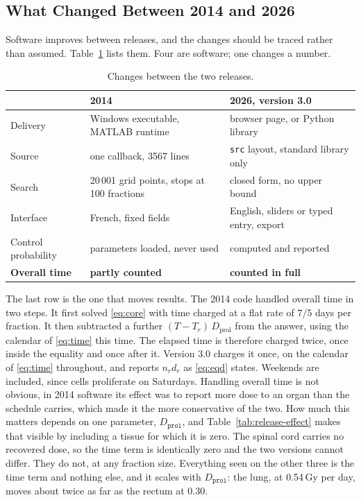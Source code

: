 \documentclass[preprint,12pt,number]{elsarticle}
\begin{document}
\subsection{What Changed Between 2014 and 2026} \label{sec:release}
Software improves between releases, and the changes should be traced rather than assumed. Table~\ref{tab:release} lists them. Four are software; one changes a number.
    \begin{table}
    \centering
    \small
    \begin{tabular}{@{}lp{5.2cm}p{5.2cm}@{}}
    \toprule
     & \textbf{2014} & \textbf{2026, version 3.0} \\
    \midrule
    Delivery & Windows executable, MATLAB runtime & browser page, or Python library \\
    Source & one callback, 3567 lines & \texttt{src} layout, standard library only \\
    Search & 20\,001 grid points, stops at 100 fractions & closed form, no upper bound \\
    Interface & French, fixed fields & English, sliders or typed entry, export \\
    Control probability & parameters loaded, never used & computed and reported \\[0.8ex]
    \textbf{Overall time} & \textbf{partly counted} & \textbf{counted in full} \\
    \bottomrule
    \end{tabular}
    \caption{Changes between the two releases.}
    \label{tab:release}
    \end{table}
The last row is the one that moves results. The 2014 code handled overall time in two steps. It first solved \eqref{eq:core} with time charged at a flat rate of $7/5$ days per fraction. It then subtracted a further $(T - T_r)\,D_\mathrm{prol}$ from the answer, using the calendar of \eqref{eq:time} this time. The elapsed time is therefore charged twice, once inside the equality and once after it. Version 3.0 charges it once, on the calendar of \eqref{eq:time} throughout, and reports $n_r d_r$ as \eqref{eq:eqd} states. Weekends are included, since cells proliferate on Saturdays. Handling overall time is not obvious, in 2014 software its effect was to report more dose to an organ than the schedule carries, which made it the more conservative of the two. How much this matters depends on one parameter, $D_\texttt{prol}$, and Table~\ref{tab:release-effect} makes that visible by including a tissue for which it is zero. The spinal cord carries no recovered dose, so the time term is identically zero and the two versions cannot differ. They do not, at any fraction size. Everything seen on the other three is the time term and nothing else, and it scales with $D_\texttt{prol}$: the lung, at 0.54\,Gy per day, moves about twice as far as the rectum at 0.30.
\end{document}
